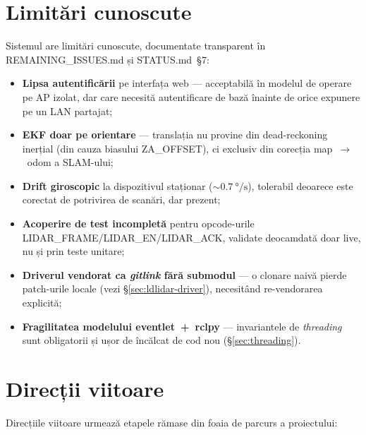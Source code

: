 \documentclass[a4paper,12pt,twoside,openany]{report}
\renewcommand{\texttt}[1]{\textnormal{#1}}
\begin{document}
\section{Limitări cunoscute}
\label{sec:limitations}

Sistemul are limitări cunoscute, documentate transparent în
\texttt{REMAINING\_ISSUES.md} și \texttt{STATUS.md}~§7:

\begin{itemize}\itemsep0pt
    \item \textbf{Lipsa autentificării} pe interfața web --- acceptabilă în
          modelul de operare pe AP izolat, dar care necesită autentificare
          de bază înainte de orice expunere pe un LAN partajat;
    \item \textbf{EKF doar pe orientare} --- translația nu provine din
          dead-reckoning inerțial (din cauza biasului \texttt{ZA\_OFFSET}),
          ci exclusiv din corecția \texttt{map}~$\to$~\texttt{odom} a SLAM-ului;
    \item \textbf{Drift giroscopic} la dispozitivul staționar
          ($\sim\SI{0.7}{\degree\per\second}$), tolerabil deoarece este
          corectat de potrivirea de scanări, dar prezent;
    \item \textbf{Acoperire de test incompletă} pentru opcode-urile
          \texttt{LIDAR\_FRAME}/\texttt{LIDAR\_EN}/\texttt{LIDAR\_ACK},
          validate deocamdată doar live, nu și prin teste unitare;
    \item \textbf{Driverul vendorat ca \textit{gitlink} fără submodul} ---
          o clonare naivă pierde patch-urile locale (vezi
          §\ref{sec:ldlidar-driver}), necesitând re-vendorarea explicită;
    \item \textbf{Fragilitatea modelului eventlet~+~rclpy} --- invariantele
          de \textit{threading} sunt obligatorii și ușor de încălcat de cod
          nou (§\ref{sec:threading}).
\end{itemize}

\section{Direcții viitoare}
\label{sec:future}

Direcțiile viitoare urmează etapele rămase din foaia de parcurs a
proiectului:
\end{document}
